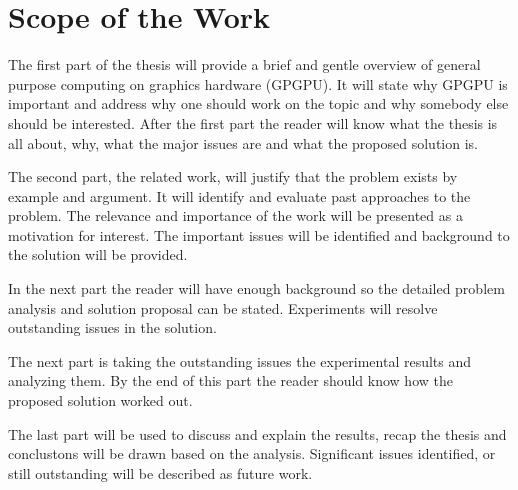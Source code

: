 \label{ch:proposal}

\section*{Scope of the Work} %
\label{sec:scope_of_the_work}

The first part of the thesis will provide a brief and gentle overview of general
purpose computing on graphics hardware (GPGPU). It will state why GPGPU is
important and address why one should work on the topic and why somebody else
should be interested. After the first part the reader will know what the thesis
is all about, why, what the major issues are and what the proposed solution is.

The second part, the related work, will justify that the problem exists by
example and argument. It will identify and evaluate past approaches to the
problem. The relevance and importance of the work will be presented as a
motivation for interest. The important issues will be identified and background
to the solution will be provided.

In the next part the reader will have enough background so the detailed problem
analysis and solution proposal can be stated. Experiments will resolve
outstanding issues in the solution.

The next part is taking the outstanding issues the experimental results and
analyzing them. By the end of this part the reader should know how the proposed
solution worked out.

The last part will be used to discuss and explain the results, recap the thesis
and conclustons will be drawn based on the analysis. Significant issues
identified, or still outstanding will be described as future work.



